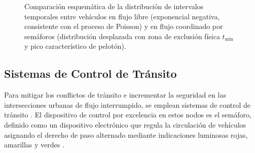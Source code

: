 \begin{figure}[H]
\centering
{}
\caption{Comparaci\'{o}n esquem\'{a}tica de la distribuci\'{o}n de intervalos temporales entre veh\'{i}culos en flujo libre (exponencial negativa, consistente con el proceso de Poisson) y en flujo coordinado por sem\'{a}foros (distribuci\'{o}n desplazada con zona de exclusi\'{o}n f\'{i}sica $t_{\min}$ y pico caracter\'{i}stico de pelot\'{o}n).}
\label{fig:distribucion_intervalos}
\end{figure}

\subsection{Sistemas de Control de Tránsito}

Para mitigar los conflictos de tránsito e incrementar la seguridad en las intersecciones urbanas de flujo interrumpido, se emplean sistemas de control de tránsito \cite[pp.~323--324]{ite_handbook}. El dispositivo de control por excelencia en estos nodos es el semáforo, definido como un dispositivo electrónico que regula la circulación de vehículos asignando el derecho de paso alternado mediante indicaciones luminosas rojas, amarillas y verdes \cite[p.~169]{calymayor}.


